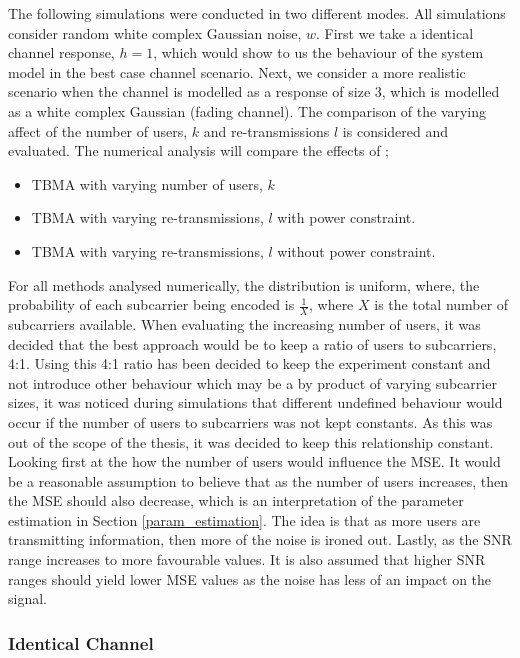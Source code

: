 \documentclass{article}
\begin{document}
The following simulations were conducted in two different modes. All simulations consider random white complex Gaussian noise, $w$. First we take a identical channel response, $h=1$, which would show to us the behaviour of the system model in the best case channel scenario. Next, we consider a more realistic scenario when the channel is modelled as a response of size 3, which is modelled as a white complex Gaussian (fading channel). The comparison of the varying affect of the number of users, $k$ and re-transmissions $l$ is considered and evaluated. 
The numerical analysis will compare the effects of ;
\begin{itemize}
    \item TBMA with varying number of users, $k$
    \item TBMA with varying re-transmissions, $l$ with power constraint.    \item TBMA with varying re-transmissions, $l$ without power constraint.
\end{itemize}

For all methods analysed numerically, the distribution is uniform, where, the probability of each subcarrier being encoded is $\frac{1}{X}$, where $X$ is the total number of subcarriers available. When evaluating the increasing number of users, it was decided that the best approach would be to keep a ratio of users to subcarriers, 4:1. Using this 4:1 ratio has been decided to keep the experiment constant and not introduce other behaviour which may be a by product of varying subcarrier sizes, it was noticed during simulations that different undefined behaviour would occur if the number of users to subcarriers was not kept constants. As this was out of the scope of the thesis, it was decided to keep this relationship constant.  
Looking first at the how the number of users would influence the MSE. It would be a reasonable assumption to believe that as the number of users increases, then the MSE should also decrease, which is an interpretation of the parameter estimation in Section \ref{param_estimation}. The idea is that as more users are transmitting information, then more of the noise is ironed out. Lastly, as the SNR range increases to more favourable values. It is also assumed that higher SNR ranges should yield lower MSE values as the noise has less of an impact on the signal. 

\subsubsection{Identical Channel}
\end{document}
